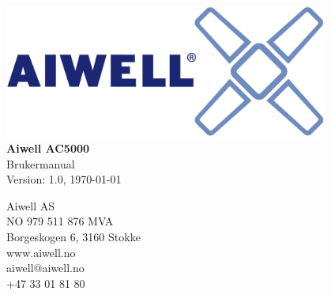 \begin{titlepage}
    \centering
    \vspace*{0.5\fill} %
    \includegraphics[width=0.8\textwidth]{src/images/logo.jpg}
    \vspace{1cm}
    \\ %
    {\Huge\bfseries Aiwell AC5000}\\[1cm] %
    {\Large Brukermanual}\\[0.5cm] %
    Version: 1.0, \today %
    
    \vfill

    \begin{adjustwidth}{0cm}{0cm} %
        \begin{flushleft}
            {\small
            Aiwell AS \\
            NO 979 511 876 MVA \\
            Borgeskogen 6, 3160 Stokke \\
            www.aiwell.no \\
            aiwell@aiwell.no \\
            +47 33 01 81 80
            }
        \end{flushleft}        
    \end{adjustwidth}
\end{titlepage}
\newpage